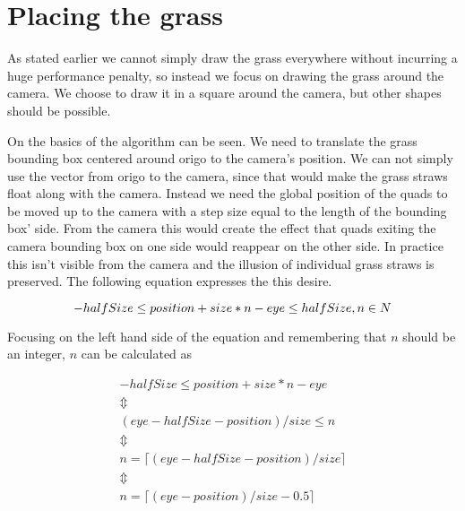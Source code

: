 \section{Placing the grass}

As stated earlier we cannot simply draw the grass everywhere without
incurring a huge performance penalty, so instead we focus on drawing
the grass around the camera. We choose to draw it in a square around
the camera, but other shapes should be possible.


On  the basics of the algorithm can be
seen. We need to translate the grass bounding box centered around
origo to the camera's position. We can not simply use the vector from
origo to the camera, since that would make the grass straws float
along with the camera. Instead we need the global position of the
quads to be moved up to the camera with a step size equal to the
length of the bounding box' side. From the camera this would create
the effect that quads exiting the camera bounding box on one side
would reappear on the other side. In practice this isn't visible from
the camera and the illusion of individual grass straws is
preserved. The following equation expresses the this desire.

\begin{displaymath}
    -halfSize \le position + size * n - eye \le halfSize, n \in N \\
\end{displaymath}

Focusing on the left hand side of the equation and remembering that
$n$ should be an integer, $n$ can be calculated as

\begin{displaymath}
  \begin{array}{l}
    -halfSize \le position + size * n - eye \\
    \Updownarrow \\
    (eye - halfSize - position) / size \le n \\
    \Updownarrow \\
    n = \lceil (eye - halfSize - position) / size \rceil \\
    \Updownarrow \\
    n = \lceil (eye - position) / size - 0.5 \rceil \\
  \end{array}
\end{displaymath}

